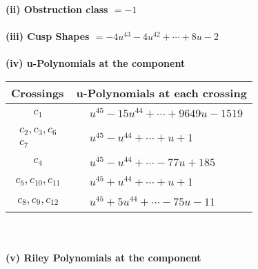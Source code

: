 \documentclass[1p]{elsarticle_modified}
\theoremstyle{definition}
\begin{document}
\flushleft \textbf{(ii) Obstruction class $= -1$}\\~\\
\flushleft \textbf{(iii) Cusp Shapes $= -4 u^{43}-4 u^{42}+\cdots+8 u-2$}\\~\\
\newpage\renewcommand{\arraystretch}{1}
\flushleft \textbf{(iv) u-Polynomials at the component}\newline \\
\begin{tabular}{m{50pt}|m{274pt}}
Crossings & \hspace{64pt}u-Polynomials at each crossing \\
\hline $$\begin{aligned}c_{1}\end{aligned}$$&$\begin{aligned}
&u^{45}-15 u^{44}+\cdots+9649 u-1519
\end{aligned}$\\
\hline $$\begin{aligned}c_{2},c_{3},c_{6}\\c_{7}\end{aligned}$$&$\begin{aligned}
&u^{45}- u^{44}+\cdots+u+1
\end{aligned}$\\
\hline $$\begin{aligned}c_{4}\end{aligned}$$&$\begin{aligned}
&u^{45}- u^{44}+\cdots-77 u+185
\end{aligned}$\\
\hline $$\begin{aligned}c_{5},c_{10},c_{11}\end{aligned}$$&$\begin{aligned}
&u^{45}+u^{44}+\cdots+u+1
\end{aligned}$\\
\hline $$\begin{aligned}c_{8},c_{9},c_{12}\end{aligned}$$&$\begin{aligned}
&u^{45}+5 u^{44}+\cdots-75 u-11
\end{aligned}$\\
\hline
\end{tabular}\\~\\
\newpage\renewcommand{\arraystretch}{1}
\flushleft \textbf{(v) Riley Polynomials at the component}\newline \\
\end{document}
